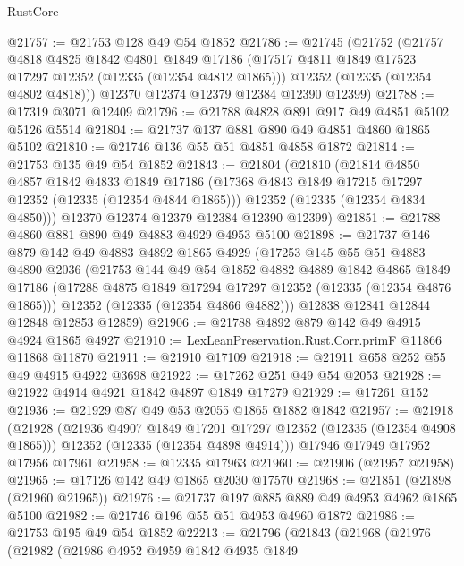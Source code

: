 \begin{lexlean}{RustCore}
\begin{coremodule}
@21757 := @21753 @128 @49 @54 @1852
@21786 := @21745
    (@21752
      (@21757
        @4818
        @4825
        @1842
        @4801
        @1849
        @17186
        (@17517 @4811 @1849 @17523 @17297 @12352 (@12335 (@12354 @4812 @1865)))
        @12352
        (@12335 (@12354 @4802 @4818)))
      @12370
      @12374
      @12379
      @12384
      @12390
      @12399)
@21788 := @17319 @3071 @12409
@21796 := @21788 @4828 @891 @917 @49 @4851 @5102 @5126 @5514
@21804 := @21737 @137 @881 @890 @49 @4851 @4860 @1865 @5102
@21810 := @21746 @136 @55 @51 @4851 @4858 @1872
@21814 := @21753 @135 @49 @54 @1852
@21843 := @21804
    (@21810
      (@21814
        @4850
        @4857
        @1842
        @4833
        @1849
        @17186
        (@17368 @4843 @1849 @17215 @17297 @12352 (@12335 (@12354 @4844 @1865)))
        @12352
        (@12335 (@12354 @4834 @4850)))
      @12370
      @12374
      @12379
      @12384
      @12390
      @12399)
@21851 := @21788 @4860 @881 @890 @49 @4883 @4929 @4953 @5100
@21898 := @21737
    @146
    @879
    @142
    @49
    @4883
    @4892
    @1865
    @4929
    (@17253
      @145
      @55
      @51
      @4883
      @4890
      @2036
      (@21753
        @144
        @49
        @54
        @1852
        @4882
        @4889
        @1842
        @4865
        @1849
        @17186
        (@17288 @4875 @1849 @17294 @17297 @12352 (@12335 (@12354 @4876 @1865)))
        @12352
        (@12335 (@12354 @4866 @4882)))
      @12838
      @12841
      @12844
      @12848
      @12853
      @12859)
@21906 := @21788 @4892 @879 @142 @49 @4915 @4924 @1865 @4927
@21910 := LexLeanPreservation.Rust.Corr.primF @11866 @11868 @11870
@21911 := @21910 @17109
@21918 := @21911 @658 @252 @55 @49 @4915 @4922 @3698
@21922 := @17262 @251 @49 @54 @2053
@21928 := @21922 @4914 @4921 @1842 @4897 @1849 @17279
@21929 := @17261 @152
@21936 := @21929 @87 @49 @53 @2055 @1865 @1882 @1842
@21957 := @21918
    (@21928
      (@21936 @4907 @1849 @17201 @17297 @12352 (@12335 (@12354 @4908 @1865)))
      @12352
      (@12335 (@12354 @4898 @4914)))
    @17946
    @17949
    @17952
    @17956
    @17961
@21958 := @12335 @17963
@21960 := @21906 (@21957 @21958)
@21965 := @17126 @142 @49 @1865 @2030 @17570
@21968 := @21851 (@21898 (@21960 @21965))
@21976 := @21737 @197 @885 @889 @49 @4953 @4962 @1865 @5100
@21982 := @21746 @196 @55 @51 @4953 @4960 @1872
@21986 := @21753 @195 @49 @54 @1852
@22213 := @21796
    (@21843
      (@21968
        (@21976
          (@21982
            (@21986
              @4952
              @4959
              @1842
              @4935
              @1849

\end{coremodule}
\end{lexlean}
